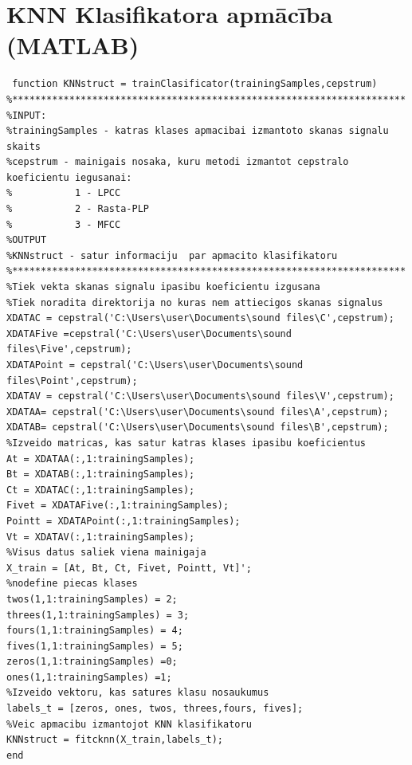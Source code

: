 \documentclass[12pt,paper=A4]{report}
\begin{document}
\section{KNN Klasifikatora apmācība (MATLAB)}
\label{appendix:piel4}
\begin{lstlisting}
 function KNNstruct = trainClasificator(trainingSamples,cepstrum)
%*********************************************************************
%INPUT:
%trainingSamples - katras klases apmacibai izmantoto skanas signalu skaits
%cepstrum - mainigais nosaka, kuru metodi izmantot cepstralo koeficientu iegusanai:
%           1 - LPCC
%           2 - Rasta-PLP
%           3 - MFCC
%OUTPUT
%KNNstruct - satur informaciju  par apmacito klasifikatoru 
%*********************************************************************
%Tiek vekta skanas signalu ipasibu koeficientu izgusana
%Tiek noradita direktorija no kuras nem attiecigos skanas signalus
XDATAC = cepstral('C:\Users\user\Documents\sound files\C',cepstrum);
XDATAFive =cepstral('C:\Users\user\Documents\sound files\Five',cepstrum);
XDATAPoint = cepstral('C:\Users\user\Documents\sound files\Point',cepstrum);
XDATAV = cepstral('C:\Users\user\Documents\sound files\V',cepstrum);
XDATAA= cepstral('C:\Users\user\Documents\sound files\A',cepstrum);
XDATAB= cepstral('C:\Users\user\Documents\sound files\B',cepstrum);
%Izveido matricas, kas satur katras klases ipasibu koeficientus
At = XDATAA(:,1:trainingSamples);
Bt = XDATAB(:,1:trainingSamples);
Ct = XDATAC(:,1:trainingSamples);
Fivet = XDATAFive(:,1:trainingSamples);
Pointt = XDATAPoint(:,1:trainingSamples);
Vt = XDATAV(:,1:trainingSamples);
%Visus datus saliek viena mainigaja
X_train = [At, Bt, Ct, Fivet, Pointt, Vt]';
%nodefine piecas klases
twos(1,1:trainingSamples) = 2;
threes(1,1:trainingSamples) = 3;
fours(1,1:trainingSamples) = 4;
fives(1,1:trainingSamples) = 5;
zeros(1,1:trainingSamples) =0;
ones(1,1:trainingSamples) =1;
%Izveido vektoru, kas satures klasu nosaukumus 
labels_t = [zeros, ones, twos, threes,fours, fives];
%Veic apmacibu izmantojot KNN klasifikatoru
KNNstruct = fitcknn(X_train,labels_t);
end
\end{lstlisting}
\end{document}

